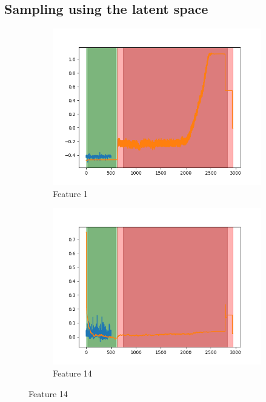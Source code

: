\documentclass[oneside, a4paper, onecolumn, 11pt]{article}
\begin{document}
\subsection{Sampling using the latent space}
\begin{figure}
  \centering
  \begin{subfigure}{0.3\textwidth}
      \centering
      \includegraphics[width=\linewidth]{images/reconstruction/dim_1.png}
      \caption{Feature 1}
  \end{subfigure}
  \hfill
  \begin{subfigure}{0.3\textwidth}
      \centering
      \includegraphics[width=\linewidth]{images/reconstruction/dim_14.png}
      \caption{Feature 14}
  \end{subfigure}

\end{figure}
\end{document}
